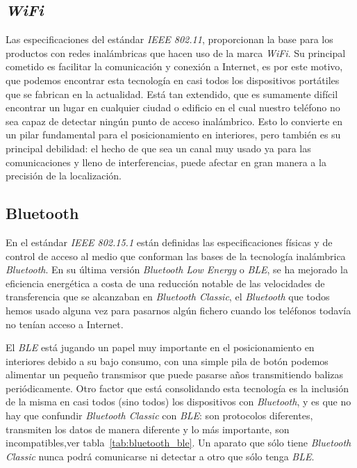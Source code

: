 \subsection{\textit{WiFi}}
Las especificaciones del estándar \textit{IEEE 802.11}, proporcionan la base para los productos con redes inalámbricas que hacen uso de la marca \textit{WiFi}. Su principal cometido es facilitar la comunicación y conexión a Internet, es por este motivo, que podemos encontrar esta tecnología en casi todos los dispositivos portátiles que se fabrican en la actualidad. Está tan extendido, que es sumamente difícil encontrar un lugar en cualquier ciudad o edificio en el cual nuestro teléfono no sea capaz de detectar ningún punto de acceso inalámbrico. Esto lo convierte en un pilar fundamental para el posicionamiento en interiores, pero también es su principal debilidad: el hecho de que sea un canal muy usado ya para las comunicaciones y lleno de interferencias, puede afectar en gran manera a la precisión de la localización.

\subsection{Bluetooth}
En el estándar \textit{IEEE 802.15.1} están definidas las especificaciones físicas y de control de acceso al medio que conforman las bases de la tecnología inalámbrica \textit{Bluetooth}. En su última versión \textit{Bluetooth Low Energy} o \textit{BLE}, se ha mejorado la eficiencia energética a costa de una reducción notable de las velocidades de transferencia que se alcanzaban en \textit{Bluetooth Classic}, el \textit{Bluetooth} que todos hemos usado alguna vez para pasarnos algún fichero cuando los teléfonos todavía no tenían acceso a Internet.

El \textit{BLE} está jugando un papel muy importante en el posicionamiento en interiores debido a su bajo consumo, con una simple pila de botón podemos alimentar un pequeño transmisor que puede pasarse años transmitiendo balizas periódicamente. Otro factor que está consolidando esta tecnología es la inclusión de la misma en casi todos (sino todos) los dispositivos con \textit{Bluetooth}, y es que no hay que confundir \textit{Bluetooth Classic} con \textit{BLE}: son protocolos diferentes, transmiten los datos de manera diferente y lo más importante, son incompatibles,ver tabla~\ref{tab:bluetooth_ble}. Un aparato que sólo tiene \textit{Bluetooth Classic} nunca podrá comunicarse ni detectar a otro que sólo tenga \textit{BLE}.

